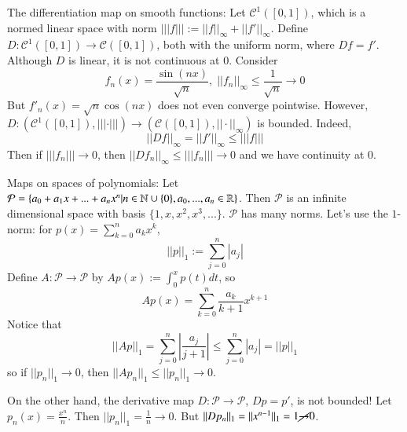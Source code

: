 \begin{eg}
    The differentiation map on smooth functions: Let $\mathcal{C}^1([0,1])$, which is a normed linear space with norm $|||f||| := ||f||_{\infty} + ||f'||_{\infty}$. Define $D:\mathcal{C}^1([0,1])\rightarrow \mathcal{C}([0,1])$, both with the uniform norm, where $Df = f'$. Although $D$ is linear, it is not continuous at $0$. Consider $$f_n(x) = \frac{\sin(nx)}{\sqrt{n}},\;||f_n||_{\infty} \leq \frac{1}{\sqrt{n}}\rightarrow 0$$ But $f'_n(x) = \sqrt{n}\cos(nx)$ does not even converge pointwise. However, $D:(\mathcal{C}^1([0,1]),|||\cdot|||)\rightarrow (\mathcal{C}([0,1]),||\cdot||_{\infty})$ is bounded. Indeed, $$||Df||_{\infty} = ||f'||_{\infty} \leq |||f|||$$ Then if $|||f_n|||\rightarrow 0$, then $||Df_n||_{\infty} \leq |||f_n|||\rightarrow 0$ and we have continuity at $0$.
\end{eg}

\begin{eg}
    Maps on spaces of polynomials: Let $\mathcal{P} = \{a_0+a_1x+...+a_nx^n\vert n\in \mathbb N\cup\{0\},a_0,...,a_n \in \mathbb R\}$. Then $\mathcal{P}$ is an infinite dimensional space with basis $\{1,x,x^2,x^3,...\}$. $\mathcal{P}$ has many norms. Let's use the $1$-norm: for $p(x) = \sum_{k=0}^na_kx^k$, $$||p||_1 := \sum_{j=0}^n|a_j|$$ Define $A:\mathcal{P}\rightarrow \mathcal{P}$ by $Ap(x) := \int_0^xp(t)dt$, so $$Ap(x) = \sum_{k=0}^n\frac{a_k}{k+1}x^{k+1}$$ Notice that $$||Ap||_1 = \sum_{j=0}^n\left|\frac{a_j}{j+1}\right| \leq \sum_{j=0}^n|a_j| = ||p||_1$$ so if $||p_n||_1\rightarrow 0$, then $||Ap_n||_1\leq ||p_n||_1\rightarrow 0$. 

    On the other hand, the derivative map $D:\mathcal{P}\rightarrow \mathcal{P}$, $Dp = p'$, is not bounded! Let $p_n(x) = \frac{x^n}{n}$. Then $||p_n||_1 = \frac{1}{n}\rightarrow 0$. But $||Dp_n||_1 = ||x^{n-1}||_1 = 1\cancel{\rightarrow}0$. 
\end{eg}

